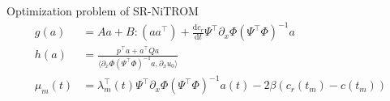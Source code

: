\documentclass[presentation]{beamer}
\begin{document}
\begin{frame}[label={sec:org2639ac2}]{Optimization problem of SR-NiTROM}
\begin{subequations}
\begin{align}
g(a) &= Aa + B:(aa^{\top}) + \frac{\mathrm{d}c_{r}}{\mathrm{d}t}\Psi^{\top}\partial_{x}\Phi(\Psi^{\top}\Phi)^{-1}a\\
h(a) &= \frac{p^{\top}a + a^{\top}Qa}{\langle\partial_{x}\Phi(\Psi^{\top}\Phi)^{-1}a, \partial_{x}u_{0}\rangle}\\
\mu_{m}(t) &= \lambda_{m}^{\top}(t)\Psi^{\top}\partial_{x}\Phi(\Psi^{\top}\Phi)^{-1}a(t) - 2\beta(c_{r}(t_{m}) - c(t_{m}))
\end{align}
\end{subequations}
\end{frame}
\end{document}
